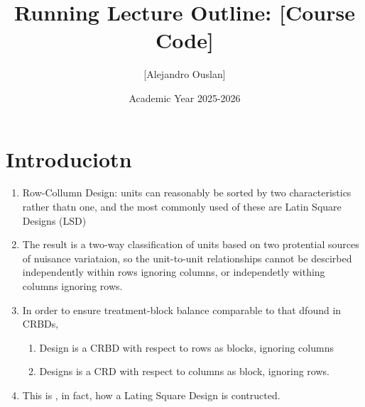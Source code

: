\documentclass[10pt, oneside]{article}
\title{Running Lecture Outline: [Course Code]}
\author{[Alejandro Ouslan]}
\date{Academic Year 2025-2026}
\begin{document}
\maketitle
\tableofcontents

\vspace{.25in}

\section{Introduciotn}
\begin{enumerate}
	\item Row-Collumn Design: units can reasonably be sorted by two
	      characteristics rather thatn one, and the most commonly used of
	      these are Latin Square Designs (LSD)
	\item The result is a two-way classification of units based on two
	      protential sources of nuisance variataion, so the unit-to-unit relationships
	      cannot be descirbed independently within rows ignoring columns, or
	      independetly withing columns ignoring rows.
	\item In order to ensure treatment-block balance comparable to that dfound in
	      CRBDs,
	      \begin{enumerate}
		      \item Design is a CRBD with respect to rows as blocks, ignoring columns
		      \item Designs is a CRD with respect to columns as block, ignoring rows.
	      \end{enumerate}
	\item This is , in fact, how a Lating Square Design is contructed.
\end{enumerate}
\end{document}
